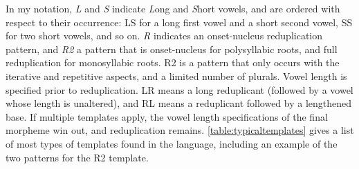 In my notation, \textit{L} and \textit{S} indicate \textit{L}ong and \textit{S}hort vowels, and are ordered with respect to their occurrence: LS for a long first vowel and a short second vowel, SS for two short vowels, and so on. \textit{R} indicates an onset-nucleus reduplication pattern, and \textit{R2} a pattern that is onset-nucleus for polysyllabic roots, and full reduplication for monosyllabic roots. R2 is a pattern that only occurs with the iterative and repetitive aspects, and a limited number of plurals. Vowel length is specified prior to reduplication. LR means a long reduplicant (followed by a vowel whose length is unaltered), and RL means a reduplicant followed by a lengthened base. If multiple templates apply, the vowel length specifications of the final morpheme win out, and reduplication remains. \cref{table:typicaltemplates} gives a list of most types of templates found in the language, including an example of the two patterns for the R2 template.

